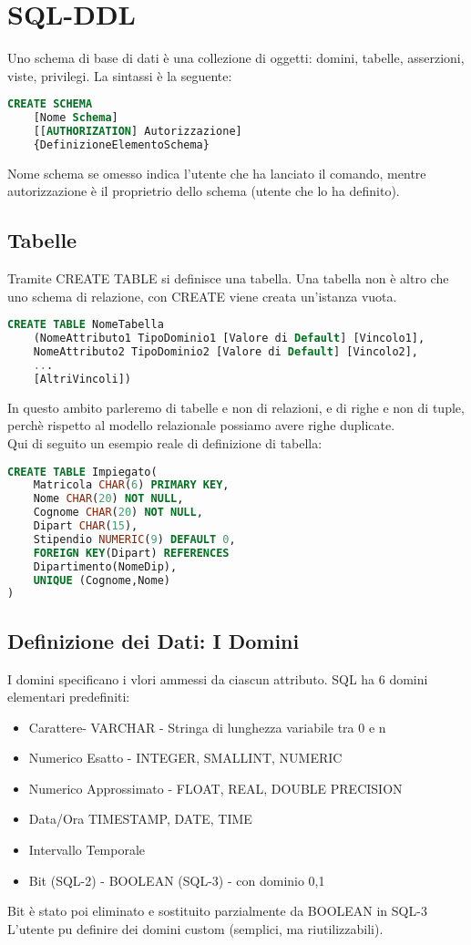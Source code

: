 \section{SQL-DDL}
Uno schema di base di dati è una collezione di oggetti: domini, tabelle,
asserzioni, viste, privilegi. La sintassi è la seguente:
\begin{lstlisting}[language=SQL]
  CREATE SCHEMA 
    [Nome Schema]
    [[AUTHORIZATION] Autorizzazione]
    {DefinizioneElementoSchema}
\end{lstlisting}
Nome schema se omesso indica l'utente che ha lanciato il comando, mentre
autorizzazione è il proprietrio dello schema (utente che lo ha definito).\\
\subsection{Tabelle}
Tramite CREATE TABLE si definisce una tabella. Una tabella non è altro che uno
schema di relazione, con CREATE viene creata un'istanza vuota.
\begin{lstlisting}[language=SQL]
  CREATE TABLE NomeTabella
    (NomeAttributo1 TipoDominio1 [Valore di Default] [Vincolo1],
    NomeAttributo2 TipoDominio2 [Valore di Default] [Vincolo2],
    ...
    [AltriVincoli])
\end{lstlisting}
In questo ambito parleremo di tabelle e non di relazioni, e di righe e non di tuple,
perchè rispetto al modello relazionale possiamo avere righe duplicate.\\
Qui di seguito un esempio reale di definizione di tabella:
\begin{lstlisting}[language=SQL]
  CREATE TABLE Impiegato(
    Matricola CHAR(6) PRIMARY KEY,
    Nome CHAR(20) NOT NULL,
    Cognome CHAR(20) NOT NULL,
    Dipart CHAR(15),
    Stipendio NUMERIC(9) DEFAULT 0,
    FOREIGN KEY(Dipart) REFERENCES
    Dipartimento(NomeDip),
    UNIQUE (Cognome,Nome)
)
\end{lstlisting}
\subsection{Definizione dei Dati: I Domini}
I domini specificano i vlori ammessi da ciascun attributo. SQL ha 
6 domini elementari predefiniti:
\begin{itemize}
  \item Carattere- VARCHAR - Stringa di lunghezza variabile tra 0 e n
  \item Numerico Esatto - INTEGER, SMALLINT, NUMERIC
  \item Numerico Approssimato - FLOAT, REAL, DOUBLE PRECISION
  \item Data/Ora TIMESTAMP, DATE, TIME
  \item Intervallo Temporale
  \item Bit (SQL-2) - BOOLEAN (SQL-3) - con dominio 0,1
\end{itemize}
Bit è stato poi eliminato e sostituito parzialmente da BOOLEAN in SQL-3\\
L'utente pu definire dei domini custom (semplici, ma riutilizzabili).\\
